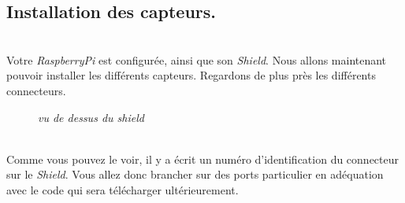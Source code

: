 \subsection{Installation des capteurs.}\\

Votre \textit{RaspberryPi} est configurée, ainsi que son \textit{Shield}. Nous allons maintenant pouvoir installer les différents capteurs. Regardons de plus près les différents connecteurs.\\

	\begin{figure}[H]
	\begin{center}
	\end{center}
		\caption{ \textit{vu de dessus du shield}}
	\end{figure}\\
	
Comme vous pouvez le voir, il y a écrit un numéro d'identification du connecteur sur le \textit{Shield}. Vous allez donc brancher sur des ports particulier en adéquation avec le code qui sera télécharger ultérieurement.\\

